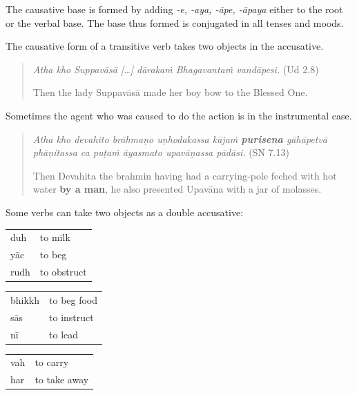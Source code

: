 \documentclass[11pt,oneside]{memoir}
\begin{document}
The causative base is formed by adding \emph{-e, -aya, -āpe, -āpaya} either to the root or the verbal base.
The base thus formed is conjugated in all tenses and moods.

The causative form of a transitive verb takes two objects in the accusative.

\begin{quote}
\emph{Atha kho Suppavāsā [\ldots{}] dārakaṁ Bhagavantaṁ vandāpesi.} (Ud 2.8)

Then the lady Suppavāsā made her boy bow to the Blessed One.
\end{quote}

Sometimes the agent who was caused to do the action is in the instrumental case.

\begin{quote}
\emph{Atha kho devahito brāhmaṇo uṇhodakassa kājaṁ \textbf{purisena} gāhāpetvā phāṇitassa ca puṭaṁ āyasmato upavāṇassa pādāsi.} (SN 7.13)

Then Devahita the brahmin having had a carrying-pole feched with hot water \textbf{by a man}, he also presented Upavāna with a jar of molasses.
\end{quote}

Some verbs can take two objects as a double accusative:

\begin{multicols}{3}

\begin{center}
\begin{tabular}{ll}
duh & to milk\\[0pt]
yāc & to beg\\[0pt]
rudh & to obstruct\\[0pt]
\end{tabular}
\end{center}

\columnbreak

\begin{center}
\begin{tabular}{ll}
bhikkh & to beg food\\[0pt]
sās & to instruct\\[0pt]
nī & to lead\\[0pt]
\end{tabular}
\end{center}

\columnbreak

\begin{center}
\begin{tabular}{ll}
vah & to carry\\[0pt]
har & to take away\\[0pt]
\end{tabular}
\end{center}

\end{multicols}
\end{document}
